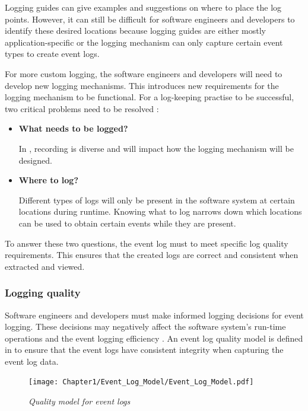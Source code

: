 Logging guides can give examples and suggestions on where to place the log points. However, it can still be difficult for software engineers and developers to identify these desired locations because logging guides are either mostly application-specific or the logging mechanism can only capture certain event types to create event logs. \par For more custom logging, the software engineers and developers will need to develop new logging mechanisms. This introduces new requirements for the logging mechanism to be functional. For a log-keeping practise to be successful, two critical problems need to be resolved \cite{Zhu2015, Zhu2019, Rong2018}:

\begin{itemize}
	\item \textbf{What needs to be logged?}\par In , recording is diverse and will impact how the logging mechanism will be designed.
	\item \textbf{Where to log?} \par Different types of logs will only be present in the software system at certain locations during runtime. Knowing what to log narrows down which locations can be used to obtain certain events while they are present.
\end{itemize}

To answer these two questions, the event log must to meet specific log quality requirements. This ensures that the created logs are correct and consistent when extracted and viewed. 

\subsubsection{Logging quality}\label{sec:ch1_loggingQuality}

Software engineers and developers must make informed logging decisions for event logging. These decisions may negatively affect the software system's run-time operations and the event logging efficiency \cite{Zhu2015, Zhu2019, Kherbouche2017}. An event log quality model is defined in  to ensure that the event logs have consistent integrity when capturing the event log data.

\clearpage

\begin{figure}[!htb]
	\centering %
	\texttt{[image: Chapter1/Event\_Log\_Model/Event\_Log\_Model.pdf]}
	\caption[Quality model for event logs]
	{\textit{Quality model for event logs \cite{Kherbouche2017}}} \label{fig:ch1_EventQModel}
\end{figure}

